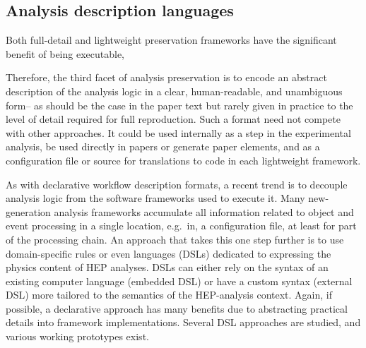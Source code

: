 \documentclass[11pt]{article}
\begin{document}
\subsection{Analysis description languages}

Both full-detail and lightweight preservation frameworks have the significant benefit of being executable, %

Therefore, the third facet of analysis preservation is to encode an abstract description of the analysis logic in a clear, human-readable, and unambiguous form-- as should be the case in the paper text but rarely given in practice to the level of detail required for full reproduction. Such a format need not compete with other approaches. It could be used internally as a step in the experimental analysis, be used directly in papers or generate paper elements, and as a configuration file or source for translations to code in each lightweight framework.

As with declarative workflow description formats, a recent trend is to decouple analysis logic from the software frameworks used to execute it. Many new-generation analysis frameworks accumulate all information related to object and event processing in a single location, e.g.~in, a configuration file, at least for part of the processing chain. An approach that takes this one step further is to use domain-specific rules or even languages (DSLs) dedicated to expressing the physics content of HEP analyses. DSLs can either rely on the syntax of an existing computer language (embedded DSL) or have a custom syntax (external DSL) more tailored to the semantics of the HEP-analysis context. Again, if possible, a declarative approach has many benefits due to abstracting practical details into framework implementations. Several DSL approaches are studied, and various working prototypes exist. 


\end{document}
